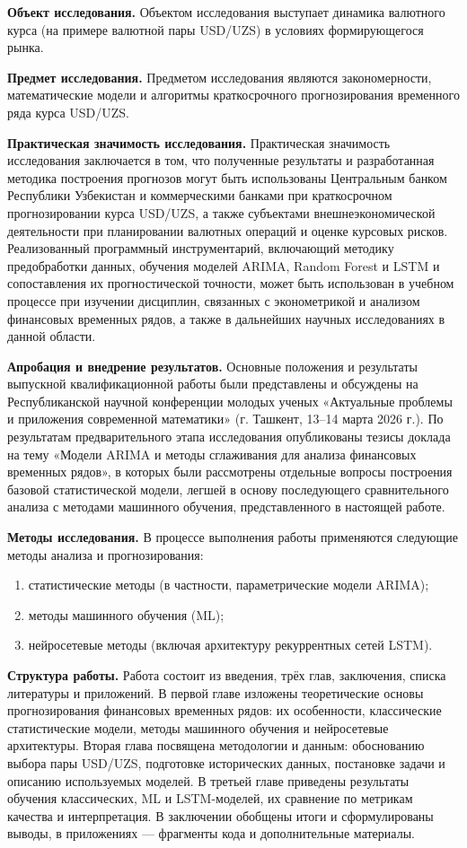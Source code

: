\textbf{Объект исследования.} Объектом исследования выступает динамика валютного курса (на примере валютной пары USD/UZS) в условиях формирующегося рынка.

\textbf{Предмет исследования.}
Предметом исследования являются закономерности, математические модели и алгоритмы краткосрочного прогнозирования временного ряда курса USD/UZS.

\textbf{Практическая значимость исследования.} Практическая значимость исследования заключается в том, что полученные результаты и 
разработанная методика построения прогнозов могут быть использованы Центральным банком 
Республики Узбекистан и коммерческими банками при краткосрочном прогнозировании курса 
USD/UZS, а также субъектами внешнеэкономической деятельности при планировании валютных 
операций и оценке курсовых рисков. Реализованный программный инструментарий, включающий 
методику предобработки данных, обучения моделей ARIMA, Random Forest и LSTM и сопоставления 
их прогностической точности, может быть использован в учебном процессе при изучении 
дисциплин, связанных с эконометрикой и анализом финансовых временных рядов, а также 
в дальнейших научных исследованиях в данной области.

\textbf{Апробация и внедрение результатов.}
Основные положения и результаты выпускной квалификационной работы были представлены и обсуждены на Республиканской научной конференции молодых ученых «Актуальные проблемы и приложения современной математики» (г. Ташкент, 13–14 марта 2026 г.). По результатам предварительного этапа исследования опубликованы тезисы доклада на тему 
«Модели ARIMA и методы сглаживания для анализа финансовых временных рядов», в которых были 
рассмотрены отдельные вопросы построения базовой статистической модели, легшей в основу 
последующего сравнительного анализа с методами машинного обучения, представленного 
в настоящей работе.

\textbf{Методы исследования.}
В процессе выполнения работы применяются следующие методы анализа и прогнозирования:
\begin{enumerate}
  \item статистические методы (в частности, параметрические модели ARIMA);
  \item методы машинного обучения (ML);
  \item нейросетевые методы (включая архитектуру рекуррентных сетей LSTM).
\end{enumerate}

\textbf{Структура работы.}
Работа состоит из введения, трёх глав, заключения, списка литературы и приложений. В первой главе изложены теоретические основы прогнозирования финансовых временных рядов: их особенности, классические статистические модели, методы машинного обучения и нейросетевые архитектуры. Вторая глава посвящена методологии и данным: обоснованию выбора пары USD/UZS, подготовке исторических данных, постановке задачи и описанию используемых моделей. В третьей главе приведены результаты обучения классических, ML и LSTM-моделей, их сравнение по метрикам качества и интерпретация. В заключении обобщены итоги и сформулированы выводы, в приложениях — фрагменты кода и дополнительные материалы.